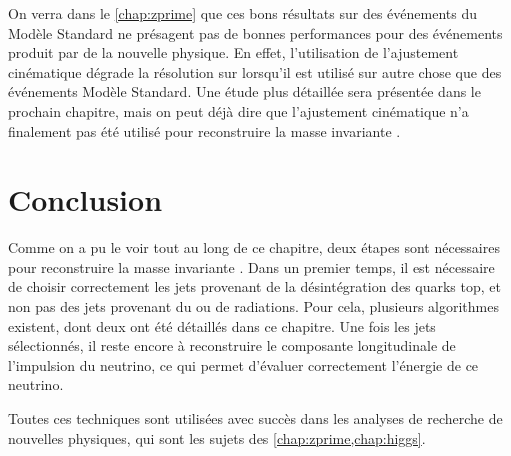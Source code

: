 \bigskip

On verra dans le \cref{chap:zprime} que ces bons résultats sur des événements \ttbar du Modèle Standard ne présagent pas de bonnes performances pour des événements \ttbar produit par de la nouvelle physique. En effet, l'utilisation de l'ajustement cinématique dégrade la résolution sur \mtt lorsqu'il est utilisé sur autre chose que des événements \ttbar Modèle Standard. Une étude plus détaillée sera présentée dans le prochain chapitre, mais on peut déjà dire que l'ajustement cinématique n'a finalement pas été utilisé pour reconstruire la masse invariante \ttbar.

\section{Conclusion}

Comme on a pu le voir tout au long de ce chapitre, deux étapes sont nécessaires pour reconstruire la masse invariante \ttbar. Dans un premier temps, il est nécessaire de choisir correctement les jets provenant de la désintégration des quarks top, et non pas des jets provenant du \pu ou de radiations. Pour cela, plusieurs algorithmes existent, dont deux ont été détaillés dans ce chapitre. Une fois les jets sélectionnés, il reste encore à reconstruire le composante longitudinale de l'impulsion du neutrino, ce qui permet d'évaluer correctement l'énergie de ce neutrino.

Toutes ces techniques sont utilisées avec succès dans les analyses de recherche de nouvelles physiques, qui sont les sujets des \cref{chap:zprime,chap:higgs}.